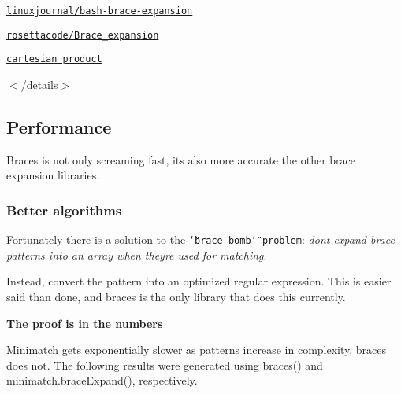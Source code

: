 \begin{DoxyItemize}
\item \href{http://www.linuxjournal.com/content/bash-brace-expansion}{\tt linuxjournal/bash-\/brace-\/expansion}
\item \href{https://rosettacode.org/wiki/Brace_expansion}{\tt rosettacode/\+Brace\+\_\+expansion}
\item \href{https://en.wikipedia.org/wiki/Cartesian_product}{\tt cartesian product}
\end{DoxyItemize}

$<$/details$>$

\subsection*{Performance}

Braces is not only screaming fast, it\textquotesingle{}s also more accurate the other brace expansion libraries.

\subsubsection*{Better algorithms}

Fortunately there is a solution to the \href{#brace-matching-pitfalls}{\tt \char`\"{}brace bomb\char`\"{} problem}\+: {\itshape don\textquotesingle{}t expand brace patterns into an array when they\textquotesingle{}re used for matching}.

Instead, convert the pattern into an optimized regular expression. This is easier said than done, and braces is the only library that does this currently.

{\bfseries The proof is in the numbers}

Minimatch gets exponentially slower as patterns increase in complexity, braces does not. The following results were generated using {\ttfamily braces()} and {\ttfamily minimatch.\+brace\+Expand()}, respectively.

